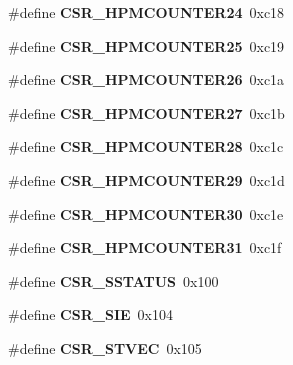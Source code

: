 \begin{DoxyCompactItemize}
\#define {\bfseries C\+S\+R\+\_\+\+H\+P\+M\+C\+O\+U\+N\+T\+E\+R24}~0xc18
\item 
\mbox{\label{riscv-utility_8h_aef51e7ffef082a9a4324ec8324af024f}} 
\#define {\bfseries C\+S\+R\+\_\+\+H\+P\+M\+C\+O\+U\+N\+T\+E\+R25}~0xc19
\item 
\mbox{\label{riscv-utility_8h_ada87ee7cd70d82c940209049f88c9875}} 
\#define {\bfseries C\+S\+R\+\_\+\+H\+P\+M\+C\+O\+U\+N\+T\+E\+R26}~0xc1a
\item 
\mbox{\label{riscv-utility_8h_ad1c6f8cf4d163939eb9483d8ce10c88e}} 
\#define {\bfseries C\+S\+R\+\_\+\+H\+P\+M\+C\+O\+U\+N\+T\+E\+R27}~0xc1b
\item 
\mbox{\label{riscv-utility_8h_a54b1bbdd4e89e1f5d2a6761dee9448fc}} 
\#define {\bfseries C\+S\+R\+\_\+\+H\+P\+M\+C\+O\+U\+N\+T\+E\+R28}~0xc1c
\item 
\mbox{\label{riscv-utility_8h_a07000fde1ab777a36de658ff34b5545e}} 
\#define {\bfseries C\+S\+R\+\_\+\+H\+P\+M\+C\+O\+U\+N\+T\+E\+R29}~0xc1d
\item 
\mbox{\label{riscv-utility_8h_a170df914640e20d349898a6bfe4adaf6}} 
\#define {\bfseries C\+S\+R\+\_\+\+H\+P\+M\+C\+O\+U\+N\+T\+E\+R30}~0xc1e
\item 
\mbox{\label{riscv-utility_8h_aac7b39ccaabe77e3f185aeb31424a13f}} 
\#define {\bfseries C\+S\+R\+\_\+\+H\+P\+M\+C\+O\+U\+N\+T\+E\+R31}~0xc1f
\item 
\mbox{\label{riscv-utility_8h_a651e65251cc54d4a553702e4cf061ca7}} 
\#define {\bfseries C\+S\+R\+\_\+\+S\+S\+T\+A\+T\+US}~0x100
\item 
\mbox{\label{riscv-utility_8h_afe9299d8a7d0f21e963ab621a6a5a5cf}} 
\#define {\bfseries C\+S\+R\+\_\+\+S\+IE}~0x104
\item 
\mbox{\label{riscv-utility_8h_ab1718f56f1c135bcd02a707b7172301b}} 
\#define {\bfseries C\+S\+R\+\_\+\+S\+T\+V\+EC}~0x105
\item 
\mbox{\label{riscv-utility_8h_ad07e81e0a35ac378254f2054e538a2b0}} 

\end{DoxyCompactItemize}
